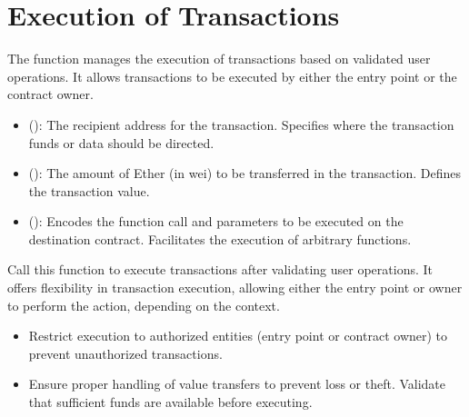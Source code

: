 \documentclass[letterpaper,10pt,english]{sphinxmanual}
\begin{document}
\section{Execution of Transactions}
\label{\detokenize{docs_minimal_account_abstraction:execution-of-transactions}}
\sphinxAtStartPar
The  function manages the execution of transactions based on validated user operations. It allows transactions to be executed by either the entry point or the contract owner.

\sphinxAtStartPar
{}

\sphinxAtStartPar
{}
\begin{itemize}
\item {} 
\sphinxAtStartPar
{} ():
The recipient address for the transaction. Specifies where the transaction funds or data should be directed.

\item {} 
\sphinxAtStartPar
{} ():
The amount of Ether (in wei) to be transferred in the transaction. Defines the transaction value.

\item {} 
\sphinxAtStartPar
{} ():
Encodes the function call and parameters to be executed on the destination contract. Facilitates the execution of arbitrary functions.

\end{itemize}

\sphinxAtStartPar
{}

\sphinxAtStartPar
Call this function to execute transactions after validating user operations. It offers flexibility in transaction execution, allowing either the entry point or owner to perform the action, depending on the context.

\sphinxAtStartPar
{}
\begin{itemize}
\item {} 
\sphinxAtStartPar
{} Restrict execution to authorized entities (entry point or contract owner) to prevent unauthorized transactions.

\item {} 
\sphinxAtStartPar
{} Ensure proper handling of value transfers to prevent loss or theft. Validate that sufficient funds are available before executing.

\end{itemize}
\end{document}
